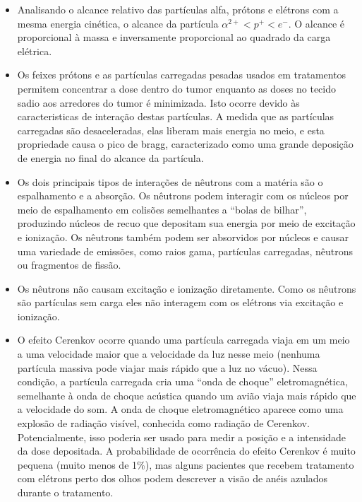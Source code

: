 \documentclass[11pt,a4paper]{article}
\newcounter{exemplo}
\begin{document}
\begin{exemplo}
\begin{itemize}
        \item Analisando o alcance relativo das partículas alfa, prótons e elétrons com a mesma energia cinética, o alcance da partícula $\alpha^{2+} < p^{+} < e^{-}$. O alcance é proporcional à massa e inversamente proporcional ao quadrado da carga elétrica.
        
        \item Os feixes prótons e as partículas carregadas pesadas usados em tratamentos permitem concentrar a dose dentro do tumor enquanto as doses no tecido sadio aos arredores do tumor é minimizada. Isto ocorre devido às caracteristicas de interação destas partículas. A medida que as partículas carregadas são desaceleradas, elas liberam mais energia no meio, e esta propriedade causa o pico de bragg, caracterizado como uma grande deposição de energia no final do alcance da partícula. 
        
        \item Os dois principais tipos de interações de nêutrons com a matéria são o espalhamento e a absorção. Os nêutrons podem interagir com os núcleos por meio de espalhamento em colisões semelhantes a “bolas de bilhar”, produzindo núcleos de recuo que depositam sua energia por meio de excitação e ionização. Os nêutrons também podem ser absorvidos por núcleos e causar uma variedade de emissões, como raios gama, partículas carregadas, nêutrons ou fragmentos de fissão.
        
        \item Os nêutrons não causam excitação e ionização diretamente. Como os nêutrons são partículas sem carga eles não interagem com os elétrons via excitação e ionização.
        
        \item O efeito Cerenkov ocorre quando uma partícula carregada viaja em um meio a uma velocidade maior que a velocidade da luz nesse meio (nenhuma partícula massiva pode viajar mais rápido que a luz no vácuo). Nessa condição, a partícula carregada cria uma “onda de choque” eletromagnética, semelhante à onda de choque acústica quando um avião viaja mais rápido que a velocidade do som. A onda de choque eletromagnético aparece como uma explosão de radiação visível, conhecida como radiação de Cerenkov. Potencialmente, isso poderia ser usado para medir a posição e a intensidade da dose depositada. A probabilidade de ocorrência do efeito Cerenkov é muito pequena (muito menos de 1\%), mas alguns pacientes que recebem tratamento com elétrons perto dos olhos podem descrever a visão de anéis azulados durante o tratamento.
        
    \end{itemize}
\end{exemplo}
\end{document}
